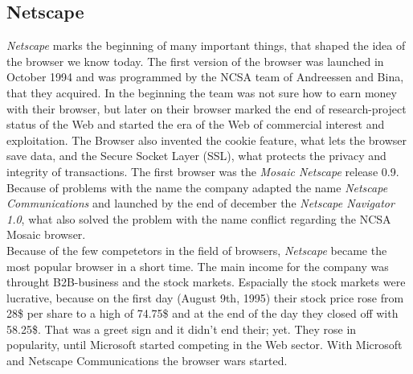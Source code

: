 \documentclass[runningheads]{llncs}
\begin{document}
		\subsection{Netscape}
		\textit{Netscape} marks the beginning of many important things, that shaped the idea of the browser we know today. The first version of the browser was launched in October 1994 and was programmed by the NCSA team of Andreessen and Bina, that they acquired. In the beginning the team was not sure how to earn money with their browser, but later on their browser marked the end of research-project status of the Web and started the era of the Web of commercial interest and exploitation. The Browser also invented the cookie feature, what lets the browser save data, and the Secure Socket Layer (SSL), what protects the privacy  and integrity of transactions. The first browser was the \textit{Mosaic Netscape} release 0.9. Because of problems with the name the company adapted the name \textit{Netscape Communications} and launched by the end of december the \textit{Netscape Navigator 1.0}, what also solved the problem with the name conflict regarding the NCSA Mosaic browser.
		\\Because of the few competetors in the field of browsers, \textit{Netscape} became the most popular browser in a short time. The main income for the company was throught B2B-business and the stock markets. Espacially the stock markets were lucrative, because on the first day (August 9th, 1995) their stock price rose from 28\$ per share to a high of 74.75\$ and at the end of the day they closed off with 58.25\$. That was a greet sign and it didn't end their; yet. They rose in popularity, until Microsoft started competing in the Web sector. With Microsoft and Netscape Communications the browser wars started.
\end{document}
